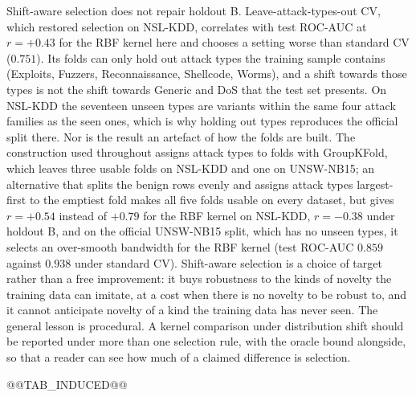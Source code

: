Shift-aware selection does not repair holdout B. Leave-attack-types-out CV, which restored selection on
NSL-KDD, correlates with test ROC-AUC at $r=+0.43$ for the RBF kernel here and chooses a setting worse
than standard CV ($0.751$). Its folds can only hold out attack types the training sample contains
(Exploits, Fuzzers, Reconnaissance, Shellcode, Worms), and a shift towards those types is not the shift
towards Generic and DoS that the test set presents. On NSL-KDD the seventeen unseen types are variants
within the same four attack families as the seen ones, which is why holding out types reproduces the
official split there. Nor is the result an artefact of how the folds are built. The construction used
throughout assigns attack types to folds with GroupKFold, which leaves three usable folds on NSL-KDD and
one on UNSW-NB15; an alternative that splits the benign rows evenly and assigns attack types largest-first
to the emptiest fold makes all five folds usable on every dataset, but gives $r=+0.54$ instead of $+0.79$
for the RBF kernel on NSL-KDD, $r=-0.38$ under holdout B, and on the official UNSW-NB15 split, which has
no unseen types, it selects an over-smooth bandwidth for the RBF kernel (test ROC-AUC $0.859$ against
$0.938$ under standard CV). Shift-aware selection is a choice of target rather than a free improvement:
it buys robustness to the kinds of novelty the training data can imitate, at a cost when there is no
novelty to be robust to, and it cannot anticipate novelty of a kind the training data has never seen.
The general lesson is procedural. A kernel comparison under distribution shift should be reported under
more than one selection rule, with the oracle bound alongside, so that a reader can see how much of a
claimed difference is selection.

@@TAB_INDUCED@@
